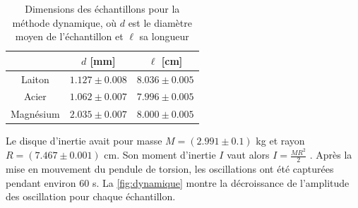 \begin{table}[h]
    \centering
    \begin{tabulary}{0.9\linewidth}{c C C}
        \toprule
        & $d$ [\si{\milli\meter}] & $\ell$ [\si{\centi\meter}] \\
        \midrule
        Laiton & $1.127 \pm 0.008$ & $8.036 \pm 0.005$ \\
        Acier & $1.062 \pm 0.007$ & $7.996 \pm 0.005$ \\
        Magnésium & $2.035 \pm 0.007$ & $8.000 \pm 0.005$ \\
        \bottomrule
    \end{tabulary}
    \caption{Dimensions des échantillons pour la méthode dynamique, où $d$ est le diamètre moyen de l'échantillon et $\ell$ sa longueur}
    \label{tab:dimensions_echantillons_dynamique}
\end{table}

Le disque d'inertie avait pour masse $M=(2.991 \pm 0.1)$ \si{\kilo\gram} et rayon $R=(7.467 \pm 0.001)$ \si{\centi\meter}. Son moment d'inertie $I$ vaut alors $I = \frac{MR^2}{2}$ \cite{notice}. Après la mise en mouvement du pendule de torsion, les oscillations ont été capturées pendant environ 60 \si{\second}. La \autoref{fig:dynamique} montre la décroissance de l'amplitude des oscillation pour chaque échantillon.

